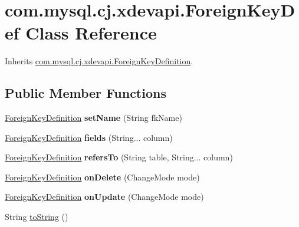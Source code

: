 \hypertarget{classcom_1_1mysql_1_1cj_1_1xdevapi_1_1_foreign_key_def}{}\section{com.\+mysql.\+cj.\+xdevapi.\+Foreign\+Key\+Def Class Reference}
\label{classcom_1_1mysql_1_1cj_1_1xdevapi_1_1_foreign_key_def}


Inherits \mbox{\hyperlink{interfacecom_1_1mysql_1_1cj_1_1xdevapi_1_1_foreign_key_definition}{com.\+mysql.\+cj.\+xdevapi.\+Foreign\+Key\+Definition}}.

\subsection*{Public Member Functions}
\begin{DoxyCompactItemize}
\item 
\mbox{\label{classcom_1_1mysql_1_1cj_1_1xdevapi_1_1_foreign_key_def_a39b5a6f9c5dc4307b38a87109cd4784d}} 
\mbox{\hyperlink{interfacecom_1_1mysql_1_1cj_1_1xdevapi_1_1_foreign_key_definition}{Foreign\+Key\+Definition}} {\bfseries set\+Name} (String fk\+Name)
\item 
\mbox{\label{classcom_1_1mysql_1_1cj_1_1xdevapi_1_1_foreign_key_def_acc462cbe87a4a3c4b53244d86a258070}} 
\mbox{\hyperlink{interfacecom_1_1mysql_1_1cj_1_1xdevapi_1_1_foreign_key_definition}{Foreign\+Key\+Definition}} {\bfseries fields} (String... column)
\item 
\mbox{\label{classcom_1_1mysql_1_1cj_1_1xdevapi_1_1_foreign_key_def_a0e7ccf961a3a7bbf2d86a9b5765645d5}} 
\mbox{\hyperlink{interfacecom_1_1mysql_1_1cj_1_1xdevapi_1_1_foreign_key_definition}{Foreign\+Key\+Definition}} {\bfseries refers\+To} (String table, String... column)
\item 
\mbox{\label{classcom_1_1mysql_1_1cj_1_1xdevapi_1_1_foreign_key_def_ab48bb84405808abf198c08595d60f438}} 
\mbox{\hyperlink{interfacecom_1_1mysql_1_1cj_1_1xdevapi_1_1_foreign_key_definition}{Foreign\+Key\+Definition}} {\bfseries on\+Delete} (Change\+Mode mode)
\item 
\mbox{\label{classcom_1_1mysql_1_1cj_1_1xdevapi_1_1_foreign_key_def_a02ca9d5d8bf9f81a8b0f2dc7b8a6861f}} 
\mbox{\hyperlink{interfacecom_1_1mysql_1_1cj_1_1xdevapi_1_1_foreign_key_definition}{Foreign\+Key\+Definition}} {\bfseries on\+Update} (Change\+Mode mode)
\item 
String \mbox{\hyperlink{classcom_1_1mysql_1_1cj_1_1xdevapi_1_1_foreign_key_def_a5b869e38335874c6a693023d4c9ced9a}{to\+String}} ()
\end{DoxyCompactItemize}
